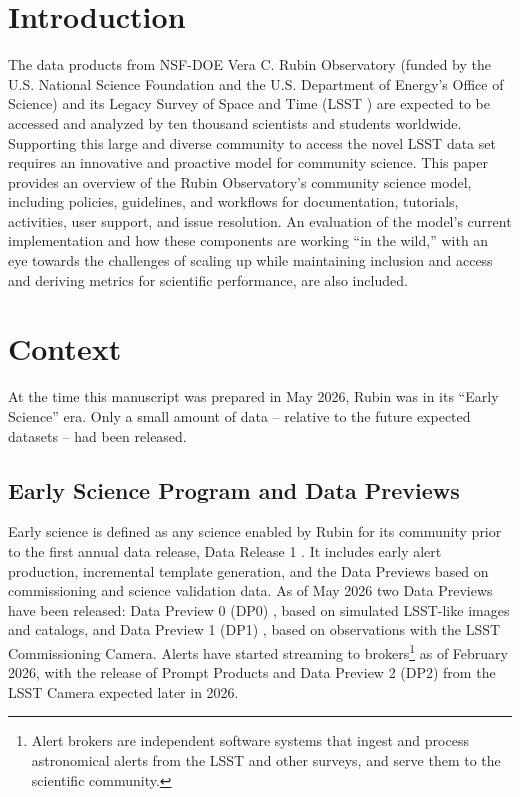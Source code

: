 \section{Introduction}

The data products from NSF-DOE Vera C. Rubin Observatory (funded by the U.S. National Science Foundation and the U.S. Department of Energy's Office of Science) and its Legacy Survey of Space and Time (LSST \cite{2019ApJ...873..111I}) are expected to be accessed and analyzed by ten thousand scientists and students worldwide.
Supporting this large and diverse community to access the novel LSST data set requires an innovative and proactive model for community science.
This paper provides an overview of the Rubin Observatory's community science model, including policies, guidelines, and workflows for documentation, tutorials, activities, user support, and issue resolution.
An evaluation of the model's current implementation and how these components are working ``in the wild,'' with an eye towards the challenges of scaling up while maintaining inclusion and access and deriving metrics for scientific performance, are also included.


\section{Context}\label{sec:context}

At the time this manuscript was prepared in May 2026, Rubin was in its ``Early Science'' era.
Only a small amount of data -- relative to the future expected datasets -- had been released.

\subsection{Early Science Program and Data Previews}

Early science is defined as any science enabled by Rubin for its community prior to the first annual data release, Data Release 1 \cite{RTN-011}.
It includes early alert production, incremental template generation, and the Data Previews based on commissioning and science validation data.
As of May 2026 two Data Previews have been released:
Data Preview 0 (DP0) \cite{RTN-041}, based on simulated LSST-like images and catalogs,
and Data Preview 1 (DP1) \cite{2026AJ....171..360V}, based on observations with the LSST Commissioning Camera.
Alerts have started streaming to brokers\footnote{Alert brokers are independent software systems that ingest and process astronomical alerts from the LSST and other surveys, and serve them to the scientific community.} as of February 2026, with the release of Prompt Products and Data Preview 2 (DP2) from the LSST Camera expected later in 2026.

